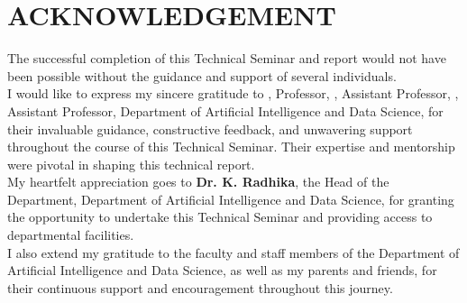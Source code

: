 \clearpage
\chapter*{ACKNOWLEDGEMENT}
\fontsize{12pt}{22pt} \selectfont
\noindent
The successful completion of this Technical Seminar and report would not have been possible without the guidance and support of several individuals.\\
\newline
\noindent
I would like to express my sincere gratitude to \textbf{\depthod}, Professor, \textbf{\thesisguidea}, Assistant Professor, \textbf{\thesisguideb}, Assistant Professor, Department of Artificial Intelligence and Data Science, for their invaluable guidance, constructive feedback, and unwavering support throughout the course of this Technical Seminar. Their expertise and mentorship were pivotal in shaping this technical report.\\
\newline
\noindent
My heartfelt appreciation goes to \textbf{Dr. K. Radhika}, the Head of the Department, Department of Artificial Intelligence and Data Science, for granting the opportunity to undertake this Technical Seminar and providing access to departmental facilities.\\
\newline
\noindent
I also extend my gratitude to the faculty and staff members of the Department of Artificial Intelligence and Data Science, as well as my parents and friends, for their continuous support and encouragement throughout this journey.
